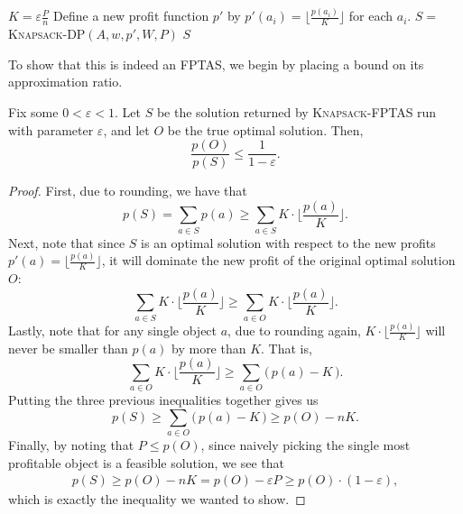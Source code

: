 \documentclass{article}
\newenvironment{lemma}[2][Lemma]{\begin{trivlist}
\item[\hskip \labelsep {\bfseries #1}\hskip \labelsep {\bfseries #2.}]}{\end{trivlist}}
\begin{document}
\begin{algorithm}
    \renewcommand{\thealgorithm}{}
    \caption{\textsc{Knapsack-FPTAS}$(A, w, p, W, P, \varepsilon)$}
    \begin{algorithmic}[1]
        \State $K = \varepsilon \frac{P}{n}$
        \State Define a new profit function $p'$ by $p'(a_i) = \big\lfloor \frac{p(a_i)}{K} \big\rfloor$ for each $a_i$.
        \State $S = $ \textsc{Knapsack-DP}$(A,w,p',W,P)$
        \State \Return $S$
    \end{algorithmic}
\end{algorithm}

\noindent To show that this is indeed an FPTAS, we begin by placing a bound on its approximation ratio.

\begin{lemma}{5.1}{}
    Fix some $0 < \varepsilon < 1$. Let $S$ be the solution returned by \textsc{Knapsack-FPTAS} run with parameter $\varepsilon$, and let $O$ be the true optimal solution. Then,
    \[
    \frac{p(O)}{p(S)} \leq \frac{1}{1 - \varepsilon}.
    \]
    \begin{proof}
        First, due to rounding, we have that
        \[
        p(S) = \sum_{a \in S} p(a) \geq \sum_{a \in S} K \cdot \Big\lfloor \frac{p(a)}{K} \Big\rfloor.
        \]
        Next, note that since $S$ is an optimal solution with respect to the new profits $p'(a) = \lfloor \frac{p(a)}{K} \rfloor$, it will dominate the new profit of the original optimal solution $O$:
        \[
        \sum_{a \in S} K \cdot \Big\lfloor \frac{p(a)}{K} \Big\rfloor \geq \sum_{a \in O} K \cdot \Big\lfloor \frac{p(a)}{K} \Big\rfloor.
        \]
        Lastly, note that for any single object $a$, due to rounding again, $K \cdot \lfloor \frac{p(a)}{K} \rfloor$ will never be smaller than $p(a)$ by more than $K$. That is,
        \[
        \sum_{a \in O} K \cdot \Big\lfloor \frac{p(a)}{K} \Big\rfloor \geq \sum_{a \in O} \big(\,p(a) - K\,\big).
        \]
        Putting the three previous inequalities together gives us
        \[
        p(S) \geq \sum_{a \in O} \big(\,p(a) - K\,\big) \geq p(O) - nK.
        \]
        Finally, by noting that $P \leq p(O)$, since naively picking the single most profitable object is a feasible solution, we see that
        \begin{align*}
            p(S) \geq p(O) - nK = p(O) - \varepsilon P \geq p(O) \cdot (1 - \varepsilon),
        \end{align*}
        which is exactly the inequality we wanted to show.
    \end{proof}
\end{lemma}
\end{document}
